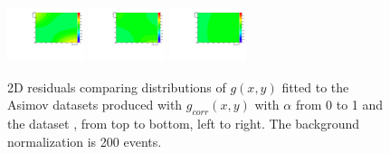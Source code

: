 \begin{figure}[h]
\includegraphics[width=0.2\textwidth]{figures/sec-background/correlation/res_th2F_res_th2f_res_alpha_08_n200.pdf}
\includegraphics[width=0.2\textwidth]{figures/sec-background/correlation/res_th2F_res_th2f_res_alpha_09_n200.pdf}
\includegraphics[width=0.2\textwidth]{figures/sec-background/correlation/res_th2F_res_th2f_res_alpha_10_n200.pdf}
  \caption{2D residuals comparing distributions of $g(x,y)$ fitted to the Asimov datasets produced with $g_{corr}(x,y)$ with $\alpha$ from 0 to 1 and the dataset , from top to bottom, left to right. The background normalization is 200 events.}
  \label{fig:res_norm200}
\end{figure}

